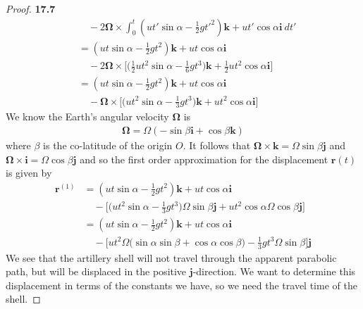 \documentclass[11pt]{article}
\theoremstyle{definition}
\begin{document}
\begin{proof}{\textbf{17.7}}
\begin{align*}
        &\quad- 2\bm{\Omega}\times \int_0^t
        (ut'\sin\alpha - \frac{1}{2}gt'^2)\bm{k} + ut'\cos\alpha \bm{i}~dt'\\
        &= (ut\sin\alpha - \frac{1}{2}gt^2)\bm{k} + ut\cos\alpha \bm{i}\\
        &\quad- 2\bm{\Omega}\times
        \bigg[\bigg(\frac{1}{2}ut^2\sin\alpha - \frac{1}{6}gt^3\bigg)\bm{k}
        + \frac{1}{2}ut^2\cos\alpha \bm{i}\bigg]\\
        &= (ut\sin\alpha - \frac{1}{2}gt^2)\bm{k} + ut\cos\alpha \bm{i}\\
        &\quad- \bm{\Omega}\times
        \bigg[\bigg(ut^2\sin\alpha - \frac{1}{3}gt^3\bigg)\bm{k}
        + ut^2\cos\alpha \bm{i}\bigg]
    \end{align*}
    We know the Earth's angular velocity $\bm{\Omega}$ is
    \begin{align*}
        \bm{\Omega} = \Omega(-\sin\beta\bm{i} + \cos\beta \bm{k})
    \end{align*}
    where $\beta$ is the co-latitude of the origin $O$.
    It follows that $\bm{\Omega}\times\bm{k} = \Omega\sin\beta \bm{j}$
    and $\bm{\Omega}\times\bm{i} = \Omega\cos\beta \bm{j}$
    and so the ﬁrst order approximation for the displacement $\bm{r}(t)$
    is given by
    \begin{align*}
        \bm r^{(1)}
        &= (ut\sin\alpha - \frac{1}{2}gt^2)\bm{k} + ut\cos\alpha \bm{i}\\
        &\quad-\bigg[\bigg(ut^2\sin\alpha - \frac{1}{3}gt^3\bigg)
        \Omega\sin\beta\bm{j}
        + ut^2\cos\alpha \Omega\cos\beta\bm{j}\bigg]\\
        &= (ut\sin\alpha - \frac{1}{2}gt^2)\bm{k} + ut\cos\alpha \bm{i}\\
        &\quad-\bigg[ut^2\Omega\bigg(\sin\alpha\sin\beta
        + \cos\alpha\cos\beta\bigg)
        - \frac{1}{3}gt^3\Omega\sin\beta
        \bigg]\bm{j}
    \end{align*}
    We see that the artillery shell will not travel through the apparent
    parabolic path, but will be displaced in the positive $\bm{j}$-direction.
    We want to determine this displacement in terms of the constants we have,
    so we need the travel time of the shell.


\end{proof}
\end{document}
